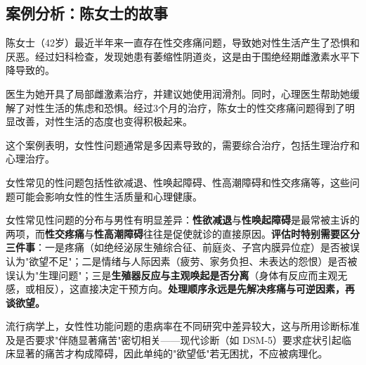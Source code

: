 \subsection{案例分析：陈女士的故事}

陈女士（42岁）最近半年来一直存在性交疼痛问题，导致她对性生活产生了恐惧和厌恶。经过妇科检查，发现她患有萎缩性阴道炎，这是由于围绝经期雌激素水平下降导致的。

医生为她开具了局部雌激素治疗，并建议她使用润滑剂。同时，心理医生帮助她缓解了对性生活的焦虑和恐惧。经过3个月的治疗，陈女士的性交疼痛问题得到了明显改善，对性生活的态度也变得积极起来。

这个案例表明，女性性问题通常是多因素导致的，需要综合治疗，包括生理治疗和心理治疗。

女性常见的性问题包括性欲减退、性唤起障碍、性高潮障碍和性交疼痛等，这些问题可能会影响女性的性生活质量和心理健康。

女性常见性问题的分布与男性有明显差异：\textbf{性欲减退}与\textbf{性唤起障碍}是最常被主诉的两项，而\textbf{性交疼痛}与\textbf{性高潮障碍}往往是促使就诊的直接原因。\textbf{评估时特别需要区分三件事}：一是疼痛（如绝经泌尿生殖综合征、前庭炎、子宫内膜异位症）是否被误认为"欲望不足"；二是情绪与人际因素（疲劳、家务负担、未表达的怨恨）是否被误认为"生理问题"；三是\textbf{生殖器反应与主观唤起是否分离}（身体有反应而主观无感，或相反），这直接决定干预方向。\textbf{处理顺序永远是先解决疼痛与可逆因素，再谈欲望。}

流行病学上，女性性功能问题的患病率在不同研究中差异较大，这与所用诊断标准及是否要求"伴随显著痛苦"密切相关——现代诊断（如 DSM-5）要求症状引起临床显著的痛苦才构成障碍，因此单纯的"欲望低"若无困扰，不应被病理化。
